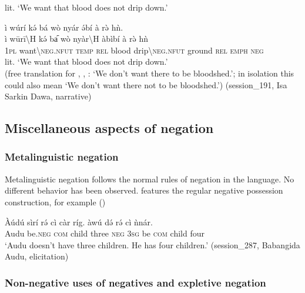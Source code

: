 \documentclass[output=paper,colorlinks,citecolor=brown]{langscibook}
\begin{document}
    \glt lit. ‘We want that blood does not drip down.’
\z 

\ea\label{ex:kam:84c} 
    \glll ì wúrí  kə́ bá wò nyár  ə́bí à rə̀ hǹ.\\ 
        ì wūrī{\textbackslash}H kə́ ba᷇  wò nyàr{\textbackslash}H àbìbí à rə̀ hǹ \\ 
        \textsc{1pl} {want{\textbackslash}\textsc{neg.nfut}} \textsc{temp} \textsc{rel} blood {drip{\textbackslash}\textsc{neg.nfut}} ground \textsc{rel} \textsc{emph} \textsc{neg}\\

    \glt lit. ‘We want that blood does not drip down.’ \\
    (free translation for , , : ‘We don’t want there to be bloodshed.’; in isolation this could also mean ‘We don’t want there not to be bloodshed.’) (session\_191, Isa Sarkin Dawa, narrative) 
\z 

\subsection{Miscellaneous aspects of negation}\label{sec:kam:4.6}

\subsubsection{Metalinguistic negation}\label{sec:kam:4.6.1}

Metalinguistic negation follows the normal rules of negation in the language. No different behavior has been observed.  features the regular negative possession construction, for example () 

\ea\label{ex:kam:85} 
    \gll Àúdú sìrí rə́ cì càr ríg. àwú də́ rə́ cì ǹnár.\\
        Audu be.\textsc{neg} \textsc{com} child three \textsc{neg} \textsc{3sg} be \textsc{com} child four\\
    \glt ‘Audu doesn’t have three children. He has four children.’ (session\_287, Babangida Audu, elicitation)
\z 

\subsubsection{Non-negative uses of negatives and expletive negation}\label{sec:kam:4.6.2}
\end{document}
